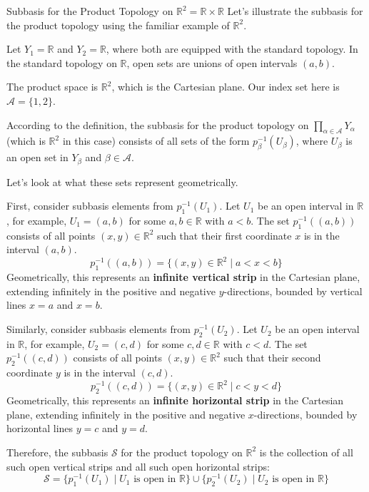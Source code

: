 \documentclass[12pt]{article} %
\begin{document}
\begin{example}
	Subbasis for the Product Topology on $\mathbb{R}^2 = \mathbb{R} \times \mathbb{R}$
	Let's illustrate the subbasis for the product topology using the familiar example of $\mathbb{R}^2$.
	
	Let $Y_1 = \mathbb{R}$ and $Y_2 = \mathbb{R}$, where both are equipped with the standard topology. In the standard topology on $\mathbb{R}$, open sets are unions of open intervals $(a,b)$.
	
	The product space is $\mathbb{R}^2$, which is the Cartesian plane. Our index set here is $\mathcal{A} = \{1, 2\}$.
	
	According to the definition, the subbasis for the product topology on $\prod_{\alpha \in \mathcal{A}} Y_\alpha$ (which is $\mathbb{R}^2$ in this case) consists of all sets of the form $p_\beta^{-1}(U_\beta)$, where $U_\beta$ is an open set in $Y_\beta$ and $\beta \in \mathcal{A}$.
	
	Let's look at what these sets represent geometrically.
	
	First, consider subbasis elements from $p_1^{-1}(U_1)$. Let $U_1$ be an open interval in $\mathbb{R}$, for example, $U_1 = (a,b)$ for some $a,b \in \mathbb{R}$ with $a < b$.
	The set $p_1^{-1}((a,b))$ consists of all points $(x,y) \in \mathbb{R}^2$ such that their first coordinate $x$ is in the interval $(a,b)$.
	$$ p_1^{-1}((a,b)) = \{ (x,y) \in \mathbb{R}^2 \mid a < x < b \} $$
	Geometrically, this represents an \textbf{infinite vertical strip} in the Cartesian plane, extending infinitely in the positive and negative $y$-directions, bounded by vertical lines $x=a$ and $x=b$.
	
	Similarly, consider subbasis elements from $p_2^{-1}(U_2)$. Let $U_2$ be an open interval in $\mathbb{R}$, for example, $U_2 = (c,d)$ for some $c,d \in \mathbb{R}$ with $c < d$.
	The set $p_2^{-1}((c,d))$ consists of all points $(x,y) \in \mathbb{R}^2$ such that their second coordinate $y$ is in the interval $(c,d)$.
	$$ p_2^{-1}((c,d)) = \{ (x,y) \in \mathbb{R}^2 \mid c < y < d \} $$
	Geometrically, this represents an \textbf{infinite horizontal strip} in the Cartesian plane, extending infinitely in the positive and negative $x$-directions, bounded by horizontal lines $y=c$ and $y=d$.
	
	Therefore, the subbasis $\mathcal{S}$ for the product topology on $\mathbb{R}^2$ is the collection of all such open vertical strips and all such open horizontal strips:
	$$ \mathcal{S} = \{ p_1^{-1}(U_1) \mid U_1 \text{ is open in } \mathbb{R} \} \cup \{ p_2^{-1}(U_2) \mid U_2 \text{ is open in } \mathbb{R} \} $$
	

\end{example}
\end{document}

